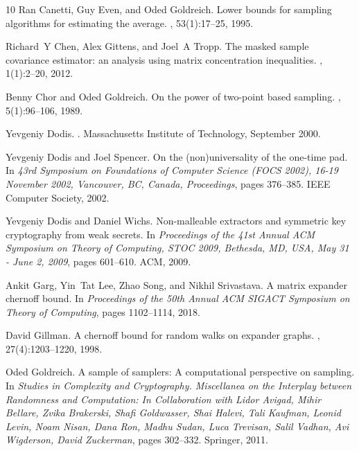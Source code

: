 \documentclass[10pt,a4paper]{article}
\newcommand{\1}{\mathbbm{1}}
\begin{document}
\begin{thebibliography}{10}
Ran Canetti, Guy Even, and Oded Goldreich.
\newblock Lower bounds for sampling algorithms for estimating the average.
, 53(1):17--25, 1995.

Richard~Y Chen, Alex Gittens, and Joel~A Tropp.
\newblock The masked sample covariance estimator: an analysis using matrix
  concentration inequalities.
, 1(1):2--20,
  2012.

Benny Chor and Oded Goldreich.
\newblock On the power of two-point based sampling.
, 5(1):96--106, 1989.

Yevgeniy Dodis.
.
\newblock Massachusetts Institute of Technology, September 2000.

Yevgeniy Dodis and Joel Spencer.
\newblock On the (non)universality of the one-time pad.
\newblock In {\em 43rd Symposium on Foundations of Computer Science {(FOCS}
  2002), 16-19 November 2002, Vancouver, BC, Canada, Proceedings}, pages
  376--385. {IEEE} Computer Society, 2002.

Yevgeniy Dodis and Daniel Wichs.
\newblock Non-malleable extractors and symmetric key cryptography from weak
  secrets.
\newblock In {\em Proceedings of the 41st Annual {ACM} Symposium on Theory of
  Computing, {STOC} 2009, Bethesda, MD, USA, May 31 - June 2, 2009}, pages
  601--610. {ACM}, 2009.

Ankit Garg, Yin~Tat Lee, Zhao Song, and Nikhil Srivastava.
\newblock A matrix expander chernoff bound.
\newblock In {\em Proceedings of the 50th Annual ACM SIGACT Symposium on Theory
  of Computing}, pages 1102--1114, 2018.

David Gillman.
\newblock A chernoff bound for random walks on expander graphs.
, 27(4):1203--1220, 1998.

Oded Goldreich.
\newblock A sample of samplers: A computational perspective on sampling.
\newblock In {\em Studies in Complexity and Cryptography. Miscellanea on the
  Interplay between Randomness and Computation: In Collaboration with Lidor
  Avigad, Mihir Bellare, Zvika Brakerski, Shafi Goldwasser, Shai Halevi, Tali
  Kaufman, Leonid Levin, Noam Nisan, Dana Ron, Madhu Sudan, Luca Trevisan,
  Salil Vadhan, Avi Wigderson, David Zuckerman}, pages 302--332. Springer,
  2011.


\end{thebibliography}
\end{document}

